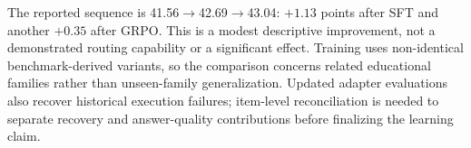 The reported sequence is 41.56$\rightarrow$42.69$\rightarrow$43.04:
$+1.13$ points after SFT and another $+0.35$ after GRPO. This is a modest
descriptive improvement, not a demonstrated routing capability or a
significant effect. Training uses non-identical benchmark-derived variants,
so the comparison concerns related educational families rather than
unseen-family generalization. Updated adapter evaluations also recover
historical execution failures; item-level reconciliation is needed to
separate recovery and answer-quality contributions before finalizing the
learning claim.
